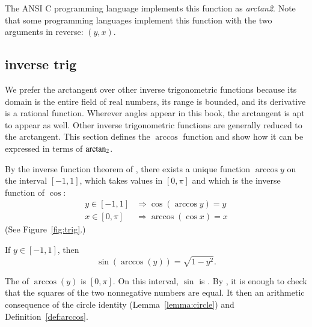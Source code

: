 The ANSI C programming language implements this function as {\it
  arctan2}.  Note that some programming languages implement this
function with the two arguments in reverse: $(y,x)$.
%
%
%
%


\subsection{inverse trig}
%

We prefer the arctangent over other inverse trigonometric functions
because its domain is the entire field of real numbers, its range is
bounded, and its derivative is a rational function.  Wherever angles
appear in this book, the arctangent is apt to appear as well.  Other
inverse trigonometric functions are generally  reduced to the
arctangent.  This section defines the $\arccos$ function and show how
it can be expressed in terms of ${\operatorname{arctan_2}}$.

\begin{definition}[arccos]
\label{def:arccos}
  By the inverse function theorem of , there exists a unique function $\arccos y$ on the
  interval $[-1,1]$, which takes values in $[0,\pi]$ and which is the
  inverse function of $\cos$:
\begin{align*}
y\in [-1,1] &\Rightarrow \cos(\arccos y) = y\\
x\in[0,\pi] &\Rightarrow \arccos(\cos x) = x
\end{align*}
%
%
(See Figure~\ref{fig:trig}.)
\end{definition}


\begin{lemma}[]\label{lemma:sin-arccos}
  If $y\in[-1,1]$, then
\[ \sin(\arccos(y)) = \sqrt{1-y^2}.\] 
\end{lemma}

\begin{proved}
  The  of $\arccos(y)$ is $[0,\pi]$.  On
  this interval, $\sin$ is .  By
  , it is enough to check that
  the squares of the two nonnegative numbers are equal.  It then an
  arithmetic consequence of the circle identity
  (Lemma~\ref{lemma:circle}) and Definition~\ref{def:arccos}.
  \swallowed\end{proved}

